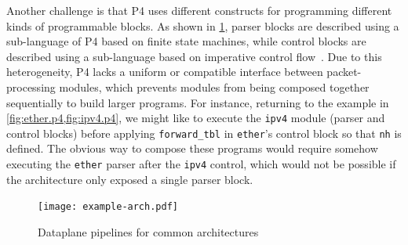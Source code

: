 \documentclass[letterpaper,twocolumn,10pt]{article}
\begin{document}
%
%
Another challenge is that P4 uses different constructs for programming
different kinds of programmable blocks. As shown in
\cref{fig:arch-example}, parser blocks are described using a
sub-language of P4 based on finite state machines, while control
blocks are described using a sub-language based on imperative control
flow~\cite{p4lang}. Due to this heterogeneity, P4 lacks a uniform or
compatible interface between packet-processing modules, which prevents
modules from being composed together sequentially to build larger
programs. For instance, returning to the example in
\cref{fig:ether.p4,fig:ipv4.p4}, we might like to execute the
\texttt{ipv4} module (parser and control blocks) before applying
\texttt{forward\_tbl} in \texttt{ether}'s control block so that
\texttt{nh} is defined. The obvious way to compose these programs would
require somehow executing the \texttt{ether} parser after the
\texttt{ipv4} control, which would not be possible if the architecture
only exposed a single parser block.

\begin{figure}[t]
  \centering
  \texttt{[image: example-arch.pdf]}
  \caption{Dataplane pipelines for common architectures}
  \label{fig:arch-example}
\end{figure}


\end{document}
